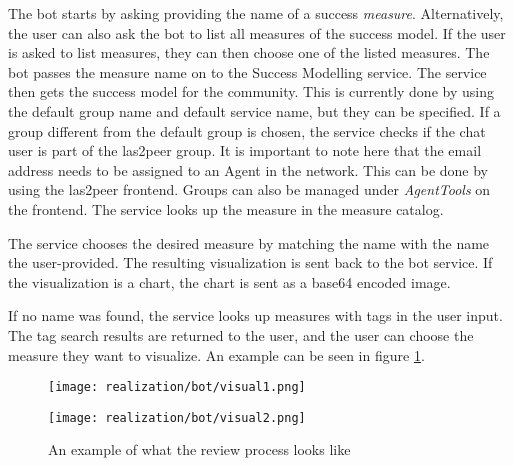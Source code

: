 The bot starts by asking providing the name of a success \emph{measure}. Alternatively, the user can also ask the bot to list all measures of the success model.
If the user is asked to list measures, they can then choose one of the listed measures. 
The bot passes the measure name on to the Success Modelling service. The service then gets the success model for the community. This is currently done by using the default group name and default service name, but they can be specified.
If a group different from the default group is chosen, the service checks if the chat user is part of the las2peer group. 
It is important to note here that the email address needs to be assigned to an Agent in the network. 
This can be done by using the las2peer frontend. 
Groups can also be managed under \emph{AgentTools} on the frontend.  
The service looks up the measure in the measure catalog. 

The service chooses the desired measure by matching the name with the name the user-provided. 
The resulting visualization is sent back to the bot service. If the visualization is a chart, the chart is sent as a base64 encoded image.

If no name was found, the service looks up measures with tags in the user input. The tag search results are returned to the user, and the user can choose the measure they want to visualize.
An example can be seen in figure \ref{fig:visualReq}.

\begin{figure}[h]
    \begin{minipage}[t]{0.5\textwidth}
        \centering
\vspace{0pt}

        \texttt{[image: realization/bot/visual1.png]} 
    \end{minipage}
    \begin{minipage}[t]{0.5\textwidth}
        \centering
\vspace{0pt}

        \texttt{[image: realization/bot/visual2.png]}
    \end{minipage}
    \caption{An example of what the review process looks like}
    \label{fig:visualReq}
\end{figure}


